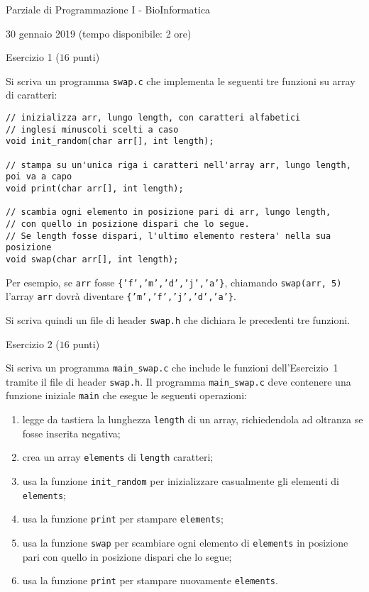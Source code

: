 \documentclass[12pt]{article}
\begin{document}
\begin{center}{\LARGE Parziale di Programmazione I - BioInformatica}\\
\vspace*{-2ex}
\begin{center}
  \large 30 gennaio 2019 (tempo disponibile: 2 ore)
\end{center}
\end{center}

\vspace*{1ex}
\begin{center}{\Large Esercizio 1} ($16$ punti)
\end{center}
Si scriva un programma \texttt{swap.c} che implementa le seguenti tre funzioni su array di caratteri:
\begin{verbatim}
// inizializza arr, lungo length, con caratteri alfabetici
// inglesi minuscoli scelti a caso
void init_random(char arr[], int length);

// stampa su un'unica riga i caratteri nell'array arr, lungo length, poi va a capo
void print(char arr[], int length);

// scambia ogni elemento in posizione pari di arr, lungo length,
// con quello in posizione dispari che lo segue.
// Se length fosse dispari, l'ultimo elemento restera' nella sua posizione
void swap(char arr[], int length);
\end{verbatim}
%
Per esempio, se \texttt{arr} fosse \texttt{\{'f','m','d','j','a'\}}, chiamando
\texttt{swap(arr, 5)} l'array \texttt{arr} dovr\`a diventare
\texttt{\{'m','f','j','d','a'\}}.

Si scriva quindi un file di header \texttt{swap.h} che dichiara le precedenti
tre funzioni.

\begin{center}{\Large Esercizio 2} ($16$ punti)\end{center}
%
Si scriva un programma \texttt{main\_swap.c} che include le funzioni dell'Esercizio~1 tramite
il file di header \texttt{swap.h}.
Il programma \texttt{main\_swap.c} deve contenere una funzione iniziale \texttt{main} che esegue
le seguenti operazioni:
\begin{enumerate}
\item legge da tastiera la lunghezza \texttt{length} di un array, richiedendola ad oltranza se fosse inserita negativa;
\item crea un array \texttt{elements} di \texttt{length} caratteri;
\item usa la funzione \texttt{init\_random} per inizializzare casualmente
  gli elementi di \texttt{elements};
\item usa la funzione \texttt{print} per stampare \texttt{elements};
\item usa la funzione \texttt{swap} per scambiare ogni elemento di \texttt{elements} in posizione pari con quello in posizione dispari che lo segue;
\item usa la funzione \texttt{print} per stampare nuovamente \texttt{elements}.
\end{enumerate}
\end{document}
